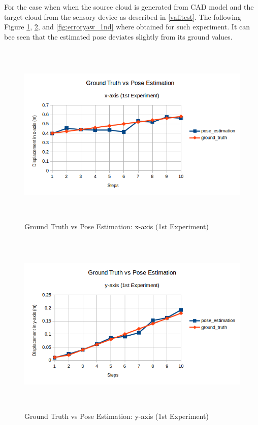 For the case when when the source cloud is generated from CAD model and the target cloud from the sensory device as described in \ref{valitest}. The following Figure \ref{fig:errorx_1nd}, \ref{fig:errory_1nd}, and \ref{fig:erroryaw_1nd} where obtained for such experiment. It can bee seen that the estimated pose deviates slightly from its ground values.
\begin{figure}[!h]
\begin{center}
\includegraphics[width=5in, height=3.5in]{figures05/1_x_validation.png}
\caption{Ground Truth vs Pose Estimation: x-axis (1st Experiment)}
\label{fig:errorx_1nd}
\end{center}
\end{figure}
\begin{figure}[!h]
\begin{center}
\includegraphics[width=5in, height=3.5in]{figures05/1_y_validation.png}
\caption{Ground Truth vs Pose Estimation: y-axis (1st Experiment)}
\label{fig:errory_1nd}
\end{center}
\end{figure}
